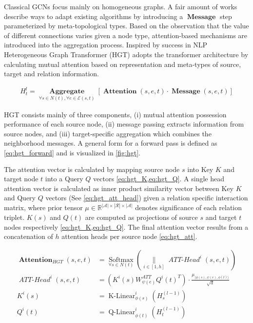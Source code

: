 \begin{secDefinition}


Classical GCNs focus mainly on homogeneous graphs. 
A fair amount of works describe ways to adapt existing algorithms by introducing a $\operatorname{\textbf{Message}}$ step parameterized by meta-topological types.
Based on the observation that the value of different connections varies given a node type, attention-based mechanisms are introduced into the aggregation process.
Inspired by success in NLP Heterogeneous Graph Transformer (HGT) \cite{huHeterogeneousGraphTransformer2020} adopts the transformer architecture \cite{vaswaniAttentionAllYou2017} by calculating mutual attention based on representation and meta-types of source, target and relation information.

\begin{align}
    H_t^l = \underset{\forall s \in N(t), \forall e \in \mathcal{E}(s, t)}{\operatorname{\textbf{Aggregate}}} \left[
    \operatorname{\textbf{Attention}}\left( s, e, t \right) \cdot
    \operatorname{\textbf{Message}}\left( s, e, t \right) 
    \right] \label{eq:hgt_forward}
\end{align}

HGT consists mainly of three components, (i) mutual attention possession performance of each source node, (ii) message passing extracts information from source nodes, and (iii) target-specific aggregation which combines the neighborhood messages.
A general form for a forward pass is defined as \cref{eq:hgt_forward} and is visualized in \cref{fig:hgt}.

The attention vector is calculated by mapping source node $s$ into Key $K$ and target node $t$ into a Query $Q$ vectors \cref{eq:hgt_K,eq:hgt_Q}.
A single head attention vector is calculated as inner product similarity vector between Key $K$ and Query $Q$ vectors (See \cref{eq:hgt_att_head}) given a relation specific interaction matrix, where prior tensor $\mu \in \mathbb{R}^{|\mathcal{A}| \times |\mathcal{R}| \times |\mathcal{A}|}$ denotes significance of each relation triplet. 
$K(s)$ and $Q(t)$ are computed as projections of source $s$ and target $t$ nodes respectively \cref{eq:hgt_K,eq:hgt_Q}.
The final attention vector results from a concatenation of $h$ attention heads per source node \cref{eq:hgt_att}.

\begin{align}
    \operatorname{\textbf{Attention}}_{H G T}(s, e, t) &= \underset{\forall s \in N(t)}{\operatorname{Softmax}} \left(\underset{i \in[1, h]}{\|} \operatorname{\textit{ATT-Head}}^{i}(s, e, t)\right) \label{eq:hgt_att} \\
        \operatorname{\mathit{ATT-Head}}^{i}(s, e, t) &=\left(K^{i}(s) W_{\psi(e)}^{A T T} Q^{i}(t)^{T}\right) \cdot \frac{\mu_{\langle\phi(s), \psi(e), \phi(t)\rangle}}{\sqrt{d}}  \label{eq:hgt_att_head} \\
        K^{i}(s) &=\operatorname{K-Linear}_{\phi(s)}^{i}\left(H^{(l-1)}_s\right) \label{eq:hgt_K} \\
        Q^{i}(t) &=\operatorname{Q-Linear}_{\phi(t)}^{i}\left(H^{(l-1)}_t\right) \label{eq:hgt_Q}
\end{align}


\end{secDefinition}
